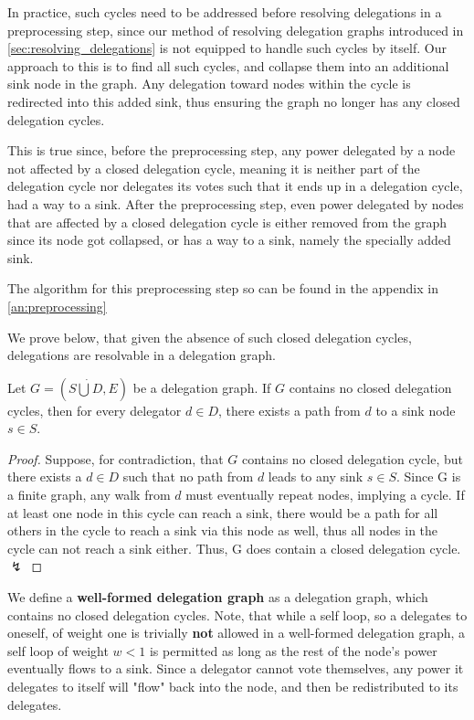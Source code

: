 In practice, such cycles need to be addressed before resolving delegations in a preprocessing step, since our method of resolving delegation graphs introduced in \cref{sec:resolving_delegations} is not equipped to handle such cycles by itself. Our approach to this is to find all such cycles, and collapse them into an additional sink node in the graph. Any delegation toward nodes within the cycle is redirected into this added sink, thus ensuring the graph no longer has any closed delegation cycles.

 This is true since, before the preprocessing step, any power delegated by a node not affected by a closed delegation cycle, meaning it is neither part of the delegation cycle nor delegates its votes such that it ends up in a delegation cycle, had a way to a sink. After the preprocessing step, even power delegated by nodes that are affected by a closed delegation cycle is either removed from the graph since its node got collapsed, or has a way to a sink, namely the specially added sink.
 
 The algorithm for this preprocessing step so can be found in the appendix in \cref{an:preprocessing}

We prove below, that given the absence of such closed delegation cycles, delegations are resolvable in a delegation graph. 

\begin{theorem}
Let $G = (S \dot\bigcup D, E)$ be a delegation graph. If $G$ contains no closed delegation cycles, then for every delegator $d \in D$, there exists a path from $d$ to a sink node $s \in S$.
\end{theorem}
\begin{proof}
Suppose, for contradiction, that $G$ contains no closed delegation cycle, but there exists a $d \in D$ such that no path from $d$ leads to any sink $s \in S$. Since G is a finite graph, any walk from $d$ must eventually repeat nodes, implying a cycle. If at least one node in this cycle can reach a sink, there would be a path for all others in the cycle to reach a sink via this node as well, thus all nodes in the cycle can not reach a sink either. Thus, G does contain a closed delegation cycle. $\lightning$
\end{proof}

We define a \textbf{well-formed delegation graph} as a delegation graph, which contains no closed delegation cycles. Note, that while a self loop, so a delegates to oneself, of weight one is trivially \textbf{not} allowed in a well-formed delegation graph, a self loop of weight $w < 1$ is permitted as long as the rest of the node's power eventually flows to a sink. Since a delegator cannot vote themselves, any power it delegates to itself will "flow" back into the node, and then be redistributed to its delegates. 

